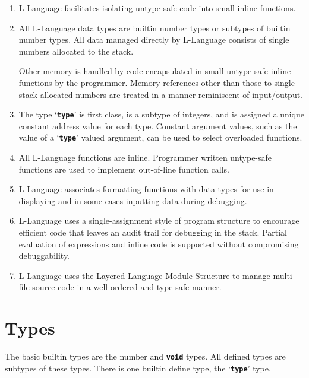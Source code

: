\documentclass[12pt]{article}
\newcommand{\TT}[1]{{\tt \bfseries #1}}
\begin{document}
\begin{enumerate}

\item
L-Language facilitates isolating untype-safe code into small inline functions.

\item
All L-Language data types are builtin number types or subtypes of
builtin number types.  All data managed directly by L-Language consists
of single numbers allocated to the stack.

Other memory is handled by code
encapsulated in small untype-safe inline functions by the programmer.
Memory references other than those to single stack allocated numbers
are treated in a manner reminiscent of input/output.

\item
The type `\TT{type}' is first class, is a subtype of integers, and
is assigned a unique constant address value for each type.  Constant
argument values, such as the value of a `\TT{type}' valued
argument, can be used to select overloaded functions.

\item
All L-Language functions are inline.  Programmer written untype-safe
functions are used to implement out-of-line function calls.

\item
L-Language associates formatting functions
with data types for use in displaying and in some cases inputting
data during debugging.

\item
L-Language uses a single-assignment style of program structure
to encourage
efficient code that leaves an audit trail for debugging in the stack.
Partial evaluation of expressions and inline code is supported without
compromising debuggability.

\item
L-Language uses the Layered Language Module Structure to manage
multi-file source code in a well-ordered and type-safe manner.


\end{enumerate}


\section{Types}
\label{TYPES}

The basic builtin types are the number and \TT{void} types.
All defined types are subtypes of these types.
There is one builtin define type, the `\TT{type}' type.
\end{document}

